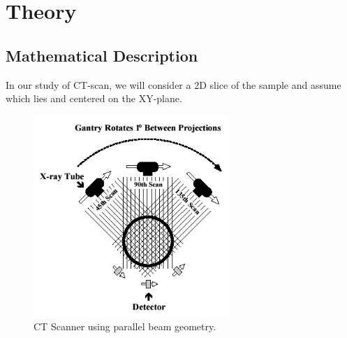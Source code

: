 \chapter{Theory} %

\label{Chapter2} %




\section{Mathematical Description}
In our study of CT-scan, we will consider a 2D slice of the
sample and assume which lies and centered on the XY-plane.


\begin{figure}[htbp]
	\centering
		\includegraphics[width=210pt]{Figures/g1CT.jpg}
	\caption[CT scanner model]{CT Scanner using parallel beam geometry.}
	\label{fig:CTmodel}
\end{figure}


